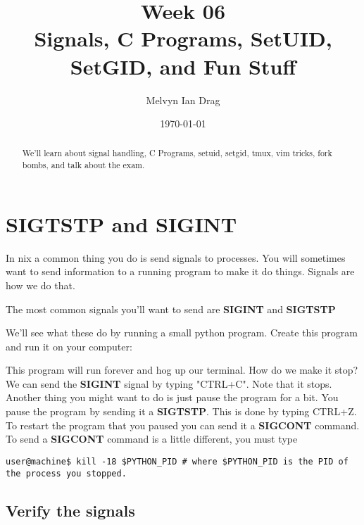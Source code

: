 \documentclass[12pt]{article}
\title{\textbf{Week 06} \\
\Large Signals, C Programs, SetUID, SetGID, and Fun Stuff }
\author{
	Melvyn Ian Drag
}
\date{\today}
\begin{document}
\maketitle

\begin{abstract}
We'll learn about signal handling, C Programs, setuid, setgid, tmux, vim tricks, fork bombs, and talk about the exam.
\end{abstract}

\section{SIGTSTP and SIGINT}
In \*nix a common thing you do is send signals to processes. You will sometimes want to send information to a running program to make it do things. Signals are how we do that. 

The most common signals you'll want to send are \textbf{SIGINT} and \textbf{SIGTSTP}

We'll see what these do by running a small python program. Create this program and run it on your computer:



This program will run forever and hog up our terminal. How do we make it stop? We can send the \textbf{SIGINT} signal by typing "CTRL+C". Note that it stops. Another thing you might want to do is just pause the program for a bit. You pause the program by sending it a \textbf{SIGTSTP}. This is done by typing CTRL+Z. To restart the program that you paused you can send it a \textbf{SIGCONT} command. To send a \textbf{SIGCONT} command is a little different, you must type

\begin{lstlisting}
user@machine$ kill -18 $PYTHON_PID # where $PYTHON_PID is the PID of the process you stopped.
\end{lstlisting}

\subsection{Verify the signals}
\end{document}
